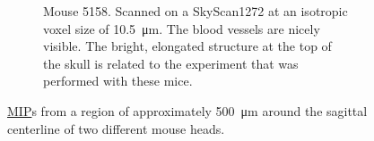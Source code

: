 \documentclass[a4paper]{exam}
\newlength\imagewidth%
\newlength\imagescale%
\begin{document}
\begin{questions}
\begin{figure}[h]
\begin{subfigure}[t]{0.495\textwidth}
%
		\caption{Mouse 5158.
		Scanned on a SkyScan1272 at an isotropic voxel size of \SI{10.5}{\micro\meter}.
		The blood vessels are nicely visible.
		The bright, elongated structure at the top of the skull is related to the experiment that was performed with these mice.}
		\label{fig:5158}
	\end{subfigure}	
	\caption{\href{https://en.wikipedia.org/wiki/Maximum_intensity_projection}{MIP}s from a region of approximately \SI{500}{\micro\meter} around the sagittal centerline of two different mouse heads.}
\end{figure}

\end{questions}
\end{document}
